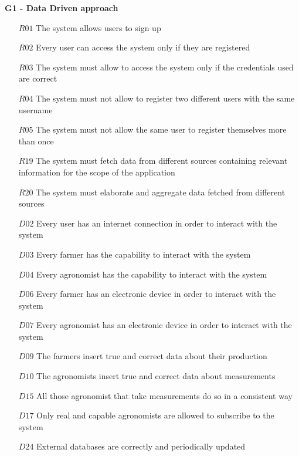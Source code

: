 \documentclass[10pt]{report}
\begin{document}
\textbf{G1 - Data Driven approach}
\begin{itemize}
    \item [$R01$] The system allows users to sign up
    \item [$R02$] Every user can access the system only if they are registered
    \item [$R03$] The system must allow to access the system only if the credentials used are correct
    \item [$R04$] The system must not allow to register two different users with the same username
    \item [$R05$] The system must not allow the same user to register themselves more than once
    \item [$R19$] The system must fetch data from different sources containing relevant information for the scope of the application
    \item [$R20$] The system must elaborate and aggregate data fetched from different sources
    \item [$D02$] Every user has an internet connection in order to interact with the system
    \item [$D03$] Every farmer has the capability to interact with the system
    \item [$D04$] Every agronomist has the capability to interact with the system
    \item [$D06$] Every farmer has an electronic device in order to interact with the system
    \item [$D07$] Every agronomist has an electronic device in order to interact with the system
    \item [$D09$] The farmers insert true and correct data about their production
    \item [$D10$] The agronomists insert true and correct data about measurements
    \item [$D15$] All those agronomist that take measurements do so in a consistent way
    \item [$D17$] Only real and capable agronomists are allowed to subscribe to the system
    \item [$D24$] External databases are correctly and periodically updated
\end{itemize}
\end{document}
